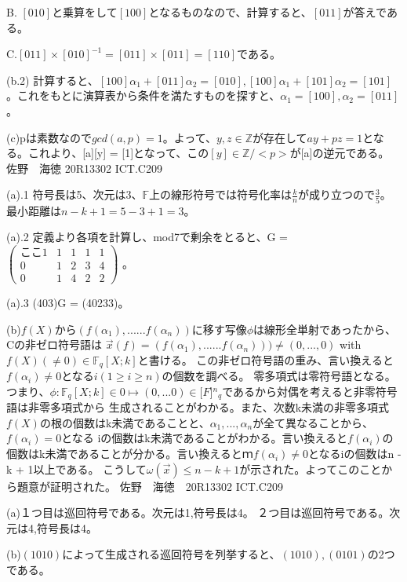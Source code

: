 \documentclass[11pt]{jsarticle}
\begin{document}
\par B. $[010]$と乗算をして$[100]$となるものなので、計算すると、$[011]$が答えである。
\par C.$[011]\times[010]^{-1} = [011] \times[011] = [110]$である。
\par (b.2)
計算すると、$[100] \alpha_1 + [011] \alpha_2 = [010], [100]\alpha_1 + [101]\alpha_2 = [101]$。これをもとに演算表から条件を満たすものを探すと、$\alpha_1 = [100],\alpha_2 = [011]$。
\par (c)pは素数なので$gcd(a,p) = 1$。よって、$y,z \in \mathbb{Z}$が存在して$ ay + pz = 1 $となる。これより、[a][y] = [1]となって、この$[y] \in \mathbb{Z} / <p>$が[a]の逆元である。\newpage
佐野　海徳 20R13302 ICT.C209\\
\par (a).1 符号長は5、次元は3、$\mathbb{F}$上の線形符号では符号化率は$\frac{k}{n}$が成り立つので$\frac{3}{5}$。最小距離は$n - k + 1 = 5 - 3 + 1 = 3$。
\par (a).2 定義より各項を計算し、mod7で剰余をとると、G = $\left(
\begin{array}{ccccc}
ここ1 & 1 & 1 & 1 & 1 \\
0 & 1 & 2 & 3 & 4 \\
0 & 1 & 4 & 2 & 2
\end{array}
\right)$
。
\par(a).3 (403)G = (40233)。
\par (b)$f(X)$から$(f(\alpha_1),......f(\alpha_n))$に移す写像$\phi$は線形全単射であったから、Cの非ゼロ符号語は
$\vec{x}(f) = (f(\alpha_1),......f(\alpha_n))) \neq (0,...,0)$ with $f(X)(\neq 0) \in \mathbb{F}_q[X;k]$と書ける。
この非ゼロ符号語の重み、言い換えると$f(\alpha_i) \neq 0$となる$i(1 \geq i \geq n)$の個数を調べる。
零多項式は零符号語となる。つまり、$\phi:\mathbb{F}_q[X;k] \in 0 \mapsto (0,...0) \in \mathbb[F]{^n}{_q}$であるから対偶を考えると非零符号語は非零多項式から
生成されることがわかる。また、次数k未満の非零多項式$f(X)$の根の個数はk未満であることと、$\alpha_1,...,\alpha_n$が全て異なることから、$f(\alpha_i) = 0$となる
iの個数はk未満であることがわかる。言い換えると$f(\alpha_i)$の個数はk未満であることが分かる。言い換えるとｍ$f(\alpha_i) \neq 0$となるiの個数はn - k + 1以上である。
こうして$\omega(\vec{x})\leq n - k + 1$が示された。よってこのことから題意が証明された。\newpage
佐野　海徳　20R13302 ICT.C209 \\
\par(a)１つ目は巡回符号である。次元は1,符号長は4。
２つ目は巡回符号である。次元は4,符号長は4。
\par(b)$(1010)$によって生成される巡回符号を列挙すると、$(1010),(0101)$の2つである。
\end{document}
